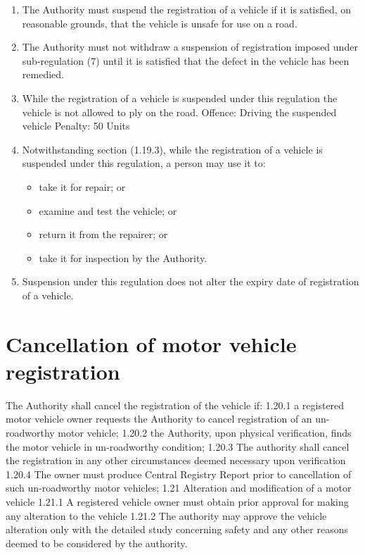 \documentclass[
]{book}
\providecommand{\tightlist}{%
  \setlength{\itemsep}{0pt}\setlength{\parskip}{0pt}}
\begin{document}
\begin{enumerate}
\def\labelenumi{\alph{enumi}.}
\tightlist
\item
  The Authority must suspend the registration of a vehicle if it is satisfied, on reasonable grounds, that the vehicle is unsafe for use on a road.
\item
  The Authority must not withdraw a suspension of registration imposed under sub-regulation (7) until it is satisfied that the defect in the vehicle has been remedied.
\item
  While the registration of a vehicle is suspended under this regulation the vehicle is not allowed to ply on the road.
  Offence: Driving the suspended vehicle
  Penalty: 50 Units
\item
  Notwithstanding section (1.19.3), while the registration of a vehicle is suspended under this regulation, a person may use it to:

  \begin{itemize}
  \tightlist
  \item
    take it for repair; or
  \item
    examine and test the vehicle; or
  \item
    return it from the repairer; or
  \item
    take it for inspection by the Authority.
  \end{itemize}
\item
  Suspension under this regulation does not alter the expiry date of registration of a vehicle.
\end{enumerate}

\hypertarget{cancellation-of-motor-vehicle-registration}{%
\section{Cancellation of motor vehicle registration}\label{cancellation-of-motor-vehicle-registration}}

The Authority shall cancel the registration of the vehicle if:
1.20.1 a registered motor vehicle owner requests the Authority to cancel registration of an un-roadworthy motor vehicle;
1.20.2 the Authority, upon physical verification, finds the motor vehicle in un-roadworthy condition;
1.20.3 The authority shall cancel the registration in any other circumstances deemed necessary upon verification
1.20.4 The owner must produce Central Registry Report prior to cancellation of such un-roadworthy motor vehicles;
1.21 Alteration and modification of a motor vehicle
1.21.1 A registered vehicle owner must obtain prior approval for making any alteration to the vehicle
1.21.2 The authority may approve the vehicle alteration only with the detailed study concerning safety and any other reasons deemed to be considered by the authority.
\end{document}
